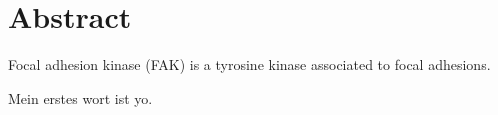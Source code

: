 \chapter*{Abstract}
Focal adhesion kinase (FAK) is a tyrosine kinase associated to focal adhesions.

Mein erstes wort ist yo.